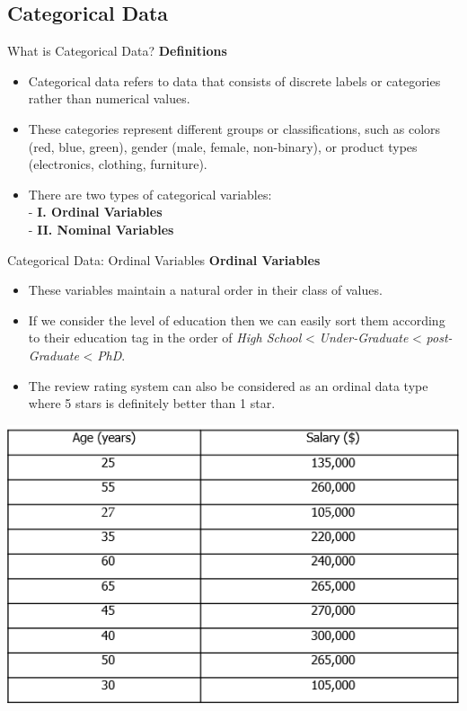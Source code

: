 \documentclass[11pt]{beamer}
\begin{document}
\subsection{Categorical Data \\ \scalebox{0.8}{}}
%
%
\begin{frame}{What is Categorical Data?}
\textbf{Definitions}
\vspace{0.5cm}
	\begin{itemize}
		\item Categorical data refers to data that consists of discrete labels or categories rather than numerical values. 
		\item These categories represent different groups or classifications, such as colors (red, blue, green), gender (male, female, non-binary), or product types (electronics, clothing, furniture). 
		\item There are two types of categorical variables:\\ \vspace{0.5cm}
		- \textbf{I. Ordinal Variables}  \\
\vspace{0.5cm}
		- \textbf{II. Nominal Variables}
	\end{itemize}
\end{frame}
%
%
\begin{frame}{Categorical Data: Ordinal Variables}
\textbf{Ordinal Variables}
	\begin{itemize}
		\item These variables maintain a natural order in their class of values. 
		\item If we consider the level of education then we can easily sort them according to their education tag in the order of \textit{High School} < \textit{ Under-Graduate} < \textit{ post-Graduate} < \textit{ PhD}. 
		\item The review rating system can also be considered as an ordinal data type where 5 stars is definitely better than 1 star.
	\end{itemize}
\begin{center}
\includegraphics[scale=.4]{../05-pictures/lesson-2-1_pic_0.png} 
\end{center}	
\end{frame}
\end{document}
